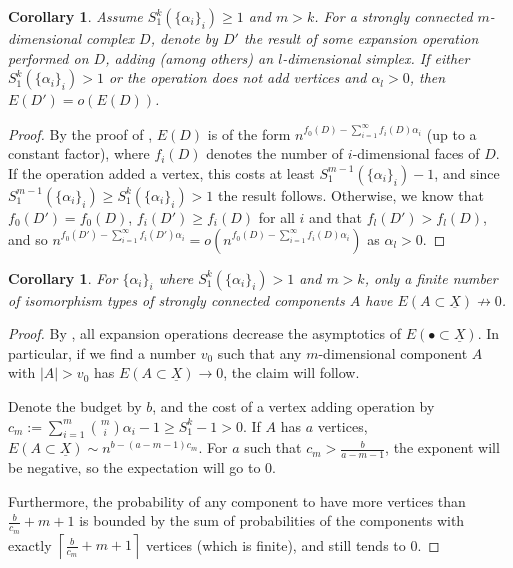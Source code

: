 \documentclass{article}
\newcommand{\ceil}[1]{\left\lceil #1 \right\rceil}
\theoremstyle{plain}
\newtheorem{corollary}[theorem]{Corollary}
\theoremstyle{definition}
\theoremstyle{remark}
\newcommand{\di}{dimension}
\begin{document}
\begin{corollary}\label{opDecreasesE}
    Assume $S_1 ^k(\{\alpha_i\}_i)\geq 1$ and $m> k$. For a strongly connected $m$-\di al complex $D$, denote by $D'$ the result of some expansion operation performed on $D$, adding (among others) an $l$-\di al simplex. 
    If either $S_1 ^k(\{\alpha_i\}_i)> 1$ or the operation does not add vertices and $\alpha_l >0$, then $E(D')= o(E(D))$.
\end{corollary}
\begin{proof}
    By the proof of , $E(D)$ is of the form $n^{f_0(D)-\sum_{i=1} ^\infty f_i(D) \alpha_i}$ (up to a constant factor), where $f_i(D)$ denotes the number of $i$-\di al faces of $D$.
    If the operation added a vertex, this costs at least $S^{m-1} _1(\{\alpha_i\}_i) -1$, and since $S^{m-1} _1(\{\alpha_i\}_i)\ge S^k _1(\{\alpha_i\}_i)>1$ the result follows. 
    Otherwise, we know that $f_0(D')= f_0(D)$, $f_i(D')\ge f_i(D)$ for all $i$ and that $f_l(D')>f_l(D)$, and so $n^{f_0(D')-\sum_{i=1} ^\infty f_i(D') \alpha_i}=o(n^{f_0(D)-\sum_{i=1} ^\infty f_i(D) \alpha_i})$ as $\alpha_l >0$.
\end{proof}
\begin{corollary}    \label{finIsoTypes}
        For $\{\alpha_i\}_i$ where $S^k _1(\{\alpha_i\}_i)>1$ and $m>k$, only a finite number of isomorphism types of strongly connected components $A$ have $E(A\subset\underline{X})\not\to 0$.
\end{corollary}
    \begin{proof}
     By , all expansion operations decrease the asymptotics of $E(\bullet\subset\underline{X})$.
     In particular, if we find a number $v_0$ such that any $m$-\di al component $A$ with $|A|>v_0$ has $E(A\subset\underline{X})\to 0$, the claim will follow.

    Denote the budget by $b$, and the cost of a vertex adding operation by $c_m:=\sum_{i=1}^m\binom{m}{i}\alpha_i-1\ge S_1^k-1>0$. If $A$ has $a$ vertices, $E(A\subset\underline{X})\sim n^{b-(a-m-1)c_m}$. For $a$ such that $c_m>\frac{b}{a-m-1}$, the exponent will be negative, so the expectation will go to 0.

    Furthermore, the probability of any component to have more vertices than  $\frac{b}{c_m} + m + 1$ is bounded by the sum of probabilities of the components with exactly  $\ceil{\frac{b}{c_m} + m + 1}$ vertices (which is finite), and still tends to 0.
    \end{proof}
\end{document}
